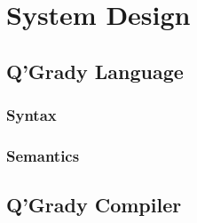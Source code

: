 \documentclass[report.tex]{subfiles}
\begin{document}
\chapter{System Design} %
\label{cha:system_design}
\section{Q'Grady Language} %
\label{sec:q_grady_language}

\subsection{Syntax} %
\label{sub:syntax}


\subsection{Semantics} %
\label{sec:semantics}


\section{Q'Grady Compiler} %
\label{sec:q_grady_compiler}

\newpage
\end{document}
